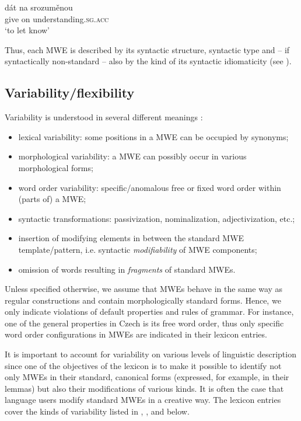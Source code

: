 \documentclass[output=paper,colorlinks,citecolor=brown]{langscibook}
\begin{document}
\ea
\gll dát                           na      srozuměnou\\
     give on understanding.\textsc{sg.acc}\\
\glt `to let know' \label{ex:srozumenou}
\z



\noindent
Thus, each MWE is described by its syntactic structure, syntactic type and -- if syntactically non-standard -- also by the kind of its syntactic idiomaticity (see ).


\subsection{Variability/flexibility}
\label{variability}

Variability is understood in several different meanings \citep{Hnatkova:etal:2017}:

\begin{itemize}
    \item lexical variability: some positions in a MWE can be occupied by synonyms;
    \item morphological variability: a MWE can possibly occur in various morphological forms;
    \item word order variability: specific/anomalous free or fixed word order within (parts of) a MWE;
    \item syntactic transformations: passivization, nominalization, adjectivization, etc.;
    \item insertion of modifying elements in between the standard MWE template/{\hskip 0pt}pattern, i.e.  syntactic \textit{modifiability} of MWE components;
    \item omission of words resulting in \textit{fragments} of standard MWEs.

\end{itemize}
Unless specified otherwise, we assume that MWEs behave in the same way as regular constructions and contain morphologically standard forms. Hence, we only indicate violations of default properties and rules of grammar. For instance, one of the general properties in Czech is its free word order, thus only specific word order configurations in MWEs are indicated in their lexicon entries.

It is important to account for variability on various levels
of linguistic description since one of the objectives of the 
lexicon is to make it possible to identify not only MWEs in their
standard, canonical forms (expressed, for example, in their lemmas) but also
their modifications of various kinds. It is often the case that
language users modify standard MWEs in a creative way. The lexicon entries cover the kinds of variability listed in  , , and  below. 
\end{document}
